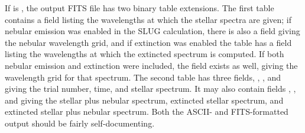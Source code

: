 \documentclass[letterpaper,10pt,english]{sphinxmanual}
\begin{document}
If  is , the output FITS file has two binary table extensions. The first table contains a field  listing the wavelengths at which the stellar spectra are given; if nebular emission was enabled in the SLUG calculation, there is also a field  giving the nebular wavelength grid, and if extinction was enabled the table has a field  listing the wavelengths at which the extincted spectrum is computed. If both nebular emission and extinction were included, the field  exists as well, giving the wavelength grid for that spectrum. The second table has three fields, , , and  giving the trial number, time, and stellar spectrum. It may also contain fields , , and  giving the stellar plus nebular spectrum, extincted stellar spectrum, and extincted stellar plus nebular spectrum. Both the ASCII- and FITS-formatted output should be fairly self-documenting.
\end{document}
